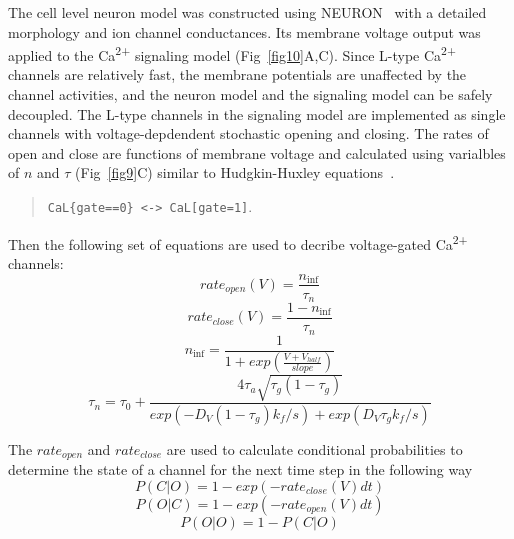 \documentclass[10pt,letterpaper]{article}
\begin{document}
The cell level neuron model was constructed using NEURON~\cite{Carnevale:2006iv} with a detailed morphology and ion channel conductances. Its membrane voltage output was applied to the Ca\textsuperscript{2+} signaling model (Fig~\ref{fig10}A,C). Since L-type Ca\textsuperscript{2+} channels are relatively fast, the membrane potentials are unaffected by the channel activities, and the neuron model and the signaling model can be safely decoupled. The L-type channels in the signaling model are implemented as single channels with voltage-depdendent stochastic opening and closing. The rates of open and close are functions of membrane voltage and calculated using varialbles of $n$ and $\tau$ (Fig~\ref{fig9}C) similar to Hudgkin-Huxley equations~\cite{Tuckwell:2012tt}.

\begin{quote}
 \verb|CaL{gate==0} <-> CaL[gate=1]|.
\end{quote}
Then the following set of equations are used to decribe voltage-gated Ca\textsuperscript{2+} channels:
\begin{equation}rate_{open}(V)=\frac{n_{\inf}}{\tau_n}\end{equation}
\begin{equation}rate_{close}(V)=\frac{1-n_{\inf}}{\tau_n}\end{equation}
\begin{equation}n_{\inf}=\frac{1}{1+exp(\frac{V+V_{half}}{slope})}\end{equation}
\begin{equation}\tau_n=\tau_0+\frac{4\tau_a\sqrt{\tau_g(1-\tau_g)}}{exp(-D_V(1-\tau_g)k_f/s)+exp(D_V\tau_gk_f/s)}\end{equation}

The $rate_{open}$ and $rate_{close}$ are used to calculate conditional probabilities to determine the state of a channel for the next time step in the following way
\begin{equation}P(C|O)=1-exp(-rate_{close}(V)dt)\end{equation}
\begin{equation}P(O|C)=1-exp(-rate_{open}(V)dt)\end{equation}
\begin{equation}P(O|O)=1-P(C|O)\end{equation}
\end{document}
